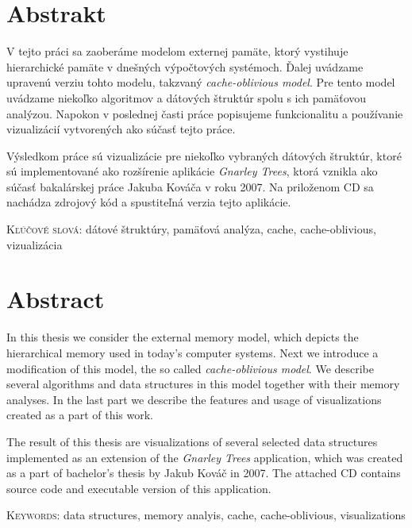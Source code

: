\chapter*{Abstrakt}

V tejto práci sa zaoberáme modelom externej pamäte, ktorý vystihuje hierarchické pamäte v dnešných výpočtových systémoch. Ďalej uvádzame upravenú verziu tohto modelu, takzvaný \emph{cache-oblivious model}. Pre tento model uvádzame niekoľko algoritmov a dátových štruktúr spolu s ich pamäťovou analýzou. Napokon v poslednej časti práce popisujeme funkcionalitu a používanie vizualizácií vytvorených ako súčasť tejto práce.

Výsledkom práce sú vizualizácie pre niekoľko vybraných \obliv dátových štruktúr, ktoré sú implementované ako rozšírenie aplikácie \emph{Gnarley Trees}, ktorá vznikla ako súčasť bakalárskej práce Jakuba Kováča v roku 2007. Na priloženom CD sa nachádza zdrojový kód a spustiteľná verzia tejto aplikácie.


\vspace{2cm}
\noindent\textsc{Kľúčové slová:} dátové štruktúry, pamäťová analýza, cache, cache-oblivious, vizualizácia

\newpage
\chapter*{Abstract}
In this thesis we consider the external memory model, which depicts the hierarchical memory used in today's computer systems. Next we introduce a modification of this model, the so called \emph{cache-oblivious model}. We describe several algorithms and data structures in this model together with their memory analyses. In the last part we describe the features and usage of visualizations created as a part of this work.

The result of this thesis are visualizations of several selected \obliv data structures implemented as an extension of the \emph{Gnarley Trees} application, which was created as a part of bachelor's thesis by Jakub Kováč in 2007. The attached CD contains source code and executable version of this application. 

\vspace{2cm}
\noindent\textsc{Keywords:} data structures, memory analyis, cache, cache-oblivious, visualizations